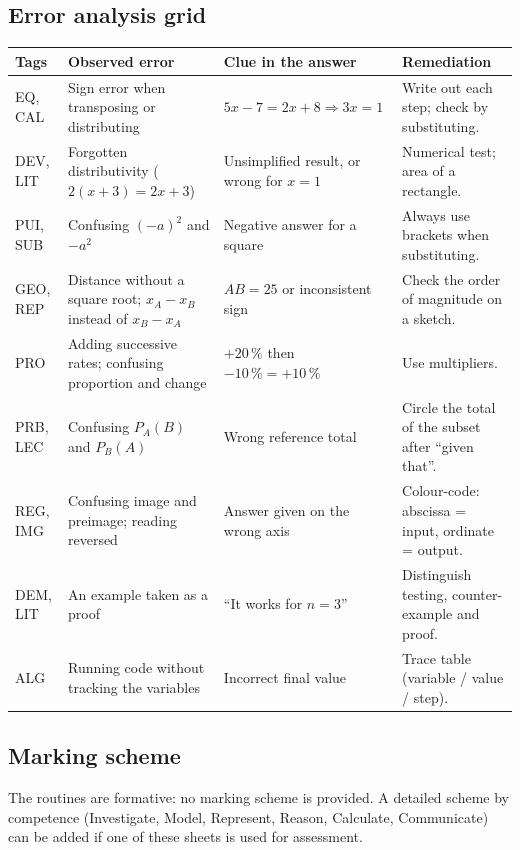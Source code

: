 \subsection*{Error analysis grid}
{\footnotesize{}
\begin{tabular}{@{}p{2.2cm} p{4.4cm} p{4.8cm} p{4.4cm}@{}}\toprule
Tags & Observed error & Clue in the answer & Remediation \\ \midrule
EQ, CAL & Sign error when transposing or distributing & $5x-7=2x+8\Rightarrow3x=1$ & Write out each step; check by substituting. \\
DEV, LIT & Forgotten distributivity ($2(x+3)=2x+3$) & Unsimplified result, or wrong for $x=1$ & Numerical test; area of a rectangle. \\
PUI, SUB & Confusing $(-a)^2$ and $-a^2$ & Negative answer for a square & Always use brackets when substituting. \\
GEO, REP & Distance without a square root; $x_A-x_B$ instead of $x_B-x_A$ & $AB=25$ or inconsistent sign & Check the order of magnitude on a sketch. \\
PRO & Adding successive rates; confusing proportion and change & $+20\,\%$ then $-10\,\%=+10\,\%$ & Use multipliers. \\
PRB, LEC & Confusing $P_A(B)$ and $P_B(A)$ & Wrong reference total & Circle the total of the subset after ``given that''. \\
REG, IMG & Confusing image and preimage; reading reversed & Answer given on the wrong axis & Colour-code: abscissa = input, ordinate = output. \\
DEM, LIT & An example taken as a proof & ``It works for $n=3$'' & Distinguish testing, counter-example and proof. \\
ALG & Running code without tracking the variables & Incorrect final value & Trace table (variable / value / step). \\ \bottomrule
\end{tabular}}

\subsection*{Marking scheme}
The routines are formative: no marking scheme is provided. A detailed scheme by competence (Investigate, Model, Represent, Reason, Calculate, Communicate) can be added if one of these sheets is used for assessment.


